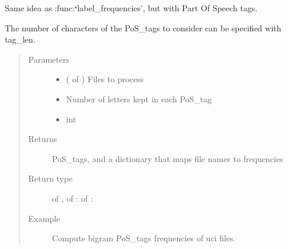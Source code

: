 \documentclass[letterpaper,10pt,english]{sphinxmanual}
\begin{document}
\begin{fulllineitems}
\label{\detokenize{analysis:loacore.analysis.frequencies.bigram_pos_tag_frequencies}}
Same idea as :func:{\color{red}\bfseries{}{}`}label\_frequencies’, but with Part Of Speech tags.

The number of characters of the PoS\_tags to consider can be specified with tag\_len.
\begin{quote}\begin{description}
\item[{Parameters}] \leavevmode\begin{itemize}
\item {} 
 ( of ) \textendash{} Files to process

\item {} 
 \textendash{} Number of letters kept in each PoS\_tag

\item {} 
 \textendash{} int

\end{itemize}

\item[{Returns}] \leavevmode
PoS\_tags, and a dictionary that maps file names to frequencies

\item[{Return type}] \leavevmode
{} of  ,  of  :  of  : 

\item[{Example}] \leavevmode
Compute bigram PoS\_tags frequencies of uci files.

\end{description}\end{quote}

\end{fulllineitems}

\end{document}
